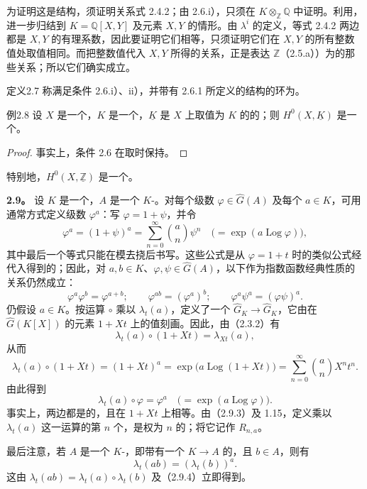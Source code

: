 为证明这是结构，须证明关系式 2.4.2；由 2.6.i），只须在 $K\otimes_{\mathbb Z}\mathbb Q$ 中证明。利用，进一步归结到 $K=\mathbb Q[X,Y]$ 及元素 $X,Y$ 的情形。由 $\lambda^i$ 的定义，等式 2.4.2 两边
都是 $X,Y$ 的有理系数，因此要证明它们相等，只须证明它们在 $X,Y$ 的所有整数值处取值相同。而把整数值代入 $X,Y$ 所得的关系，正是表达 $\mathbb Z$（2.5.a））为的那些关系；所以它们确实成立。

\begin{SGAresult}{定义}{2.7}
称满足条件 2.6.i）、ii），并带有 2.6.1 所定义的结构的环为。
\end{SGAresult}

\begin{SGAresult}{例}{2.8}
设 $X$ 是一个，$K$ 是一个，$\underline K$ 是 $X$ 上取值为 $K$ 的的；则 $H^0(X,\underline K)$ 是一个。
\end{SGAresult}
\begin{proof}
事实上，条件 2.6 在取时保持。
\end{proof}
特别地，$H^0(X,\underline{\mathbb Z})$ 是一个。

\textbf{2.9。} 设 $K$ 是一个，$A$ 是一个 $K$-。对每个级数 $\varphi\in\widehat G(A)$ 及每个 $a\in K$，可用通常方式定义级数 $\varphi^a$：写 $\varphi=1+\psi$，并令
\[
\varphi^a=(1+\psi)^a=\sum_{n=0}^{\infty}\binom an\psi^n
\quad\bigl(=\exp(a\operatorname{Log}\varphi)\bigr),
\tag{2.9.1}
\]
其中最后一个等式只能在模去挠后书写。这些公式是从 $\varphi=1+t$ 时的类似公式经代入得到的；因此，对 $a,b\in K$、$\varphi,\psi\in\widehat G(A)$，以下作为指数函数经典性质的关系仍然成立：
\[
\varphi^a\varphi^b=\varphi^{a+b};\qquad
\varphi^{ab}=(\varphi^a)^b;\qquad
\varphi^a\psi^a=(\varphi\psi)^a.
\tag{2.9.2}
\]
仍假设 $a\in K$。按运算 $\circ$ 乘以 $\lambda_t(a)$，定义了一个 $\widehat G_K\longrightarrow\widehat G_K$，它由在 $\widehat G(K[X])$ 的元素 $1+Xt$ 上的值刻画。因此，由（2.3.2）有
\[
\lambda_t(a)\circ(1+Xt)=\lambda_{Xt}(a),
\]
从而
\[
\lambda_t(a)\circ(1+Xt)=(1+Xt)^a
=\exp\bigl(a\operatorname{Log}(1+Xt)\bigr)
=\sum_{n=0}^{\infty}\binom an X^nt^n.
\tag{2.9.3}
\]
由此得到
\[
\lambda_t(a)\circ\varphi=\varphi^a
\quad\bigl(=\exp(a\operatorname{Log}\varphi)\bigr).
\tag{2.9.4}
\]
事实上，两边都是的，且在 $1+Xt$ 上相等。由（2.9.3）及 1.15，定义乘以 $\lambda_t(a)$ 这一运算的第 $n$ 个，是权为 $n$ 的；将它记作 $R_{n,a}$。

最后注意，若 $A$ 是一个 $K$-，即带有一个 $K\longrightarrow A$ 的，且 $b\in A$，则有
\[
\lambda_t(ab)=(\lambda_t(b))^a.
\tag{2.9.5}
\]
这由 $\lambda_t(ab)=\lambda_t(a)\circ\lambda_t(b)$ 及（2.9.4）立即得到。
